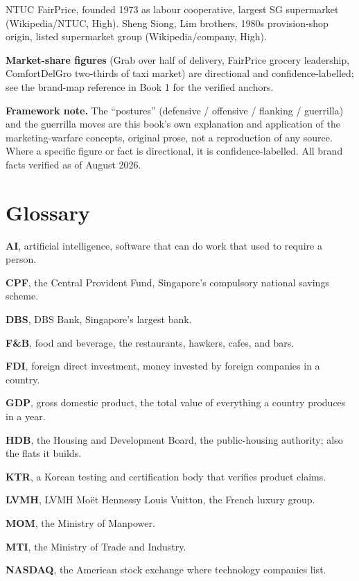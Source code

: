 \documentclass[10pt,twoside,openany]{memoir}
\newcommand{\needspacehead}{\needspace{4\baselineskip}}
\let\oldsection\section
\renewcommand{\section}{\needspacehead\oldsection}
\begin{document}
{{{{{NTUC FairPrice, founded 1973 as labour cooperative, largest SG
supermarket (Wikipedia/NTUC, High). Sheng Siong, Lim brothers, 1980s
provision-shop origin, listed supermarket group (Wikipedia/company,
High).

\textbf{Market-share figures} (Grab over half of delivery, FairPrice
grocery leadership, ComfortDelGro two-thirds of taxi market) are
directional and confidence-labelled; see the brand-map reference in Book
1 for the verified anchors.

\textbf{Framework note.} The ``postures'' (defensive / offensive /
flanking / guerrilla) and the guerrilla moves are this book's own
explanation and application of the marketing-warfare concepts, original
prose, not a reproduction of any source. Where a specific figure or fact
is directional, it is confidence-labelled. All brand facts verified as
of August 2026.

\backmatter
\section*{Glossary}\label{glossary}

\textbf{AI}, artificial intelligence, software that can do work that
used to require a person.

\textbf{CPF}, the Central Provident Fund, Singapore's compulsory
national savings scheme.

\textbf{DBS}, DBS Bank, Singapore's largest bank.

\textbf{F\&B}, food and beverage, the restaurants, hawkers, cafes, and
bars.

\textbf{FDI}, foreign direct investment, money invested by foreign
companies in a country.

\textbf{GDP}, gross domestic product, the total value of everything a
country produces in a year.

\textbf{HDB}, the Housing and Development Board, the public-housing
authority; also the flats it builds.

\textbf{KTR}, a Korean testing and certification body that verifies
product claims.

\textbf{LVMH}, LVMH Moët Hennessy Louis Vuitton, the French luxury
group.

\textbf{MOM}, the Ministry of Manpower.

\textbf{MTI}, the Ministry of Trade and Industry.

\textbf{NASDAQ}, the American stock exchange where technology companies
list.

}}}}}
\end{document}
